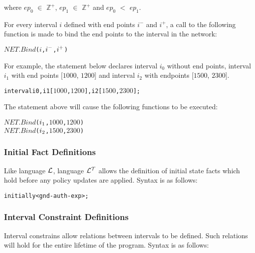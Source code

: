 \documentclass[11pt]{report}
\newenvironment{vverbatim}
{
  \begin{alltt}
}
{
  \vspace{-\baselineskip}
  \end{alltt}
}
\begin{document}
          \noindent
          where $ep_0$ $\in$ ${\mathbb Z}^+$, $ep_1$ $\in$ ${\mathbb Z}^+$ and
          $ep_0$ $<$ $ep_1$.

          For every interval $i$ defined with end points $i^-$ and $i^+$, a
          call to the following function is made to bind the end points to the
          interval in the network:

          \begin{vverbatim}
  \(NET.Bind\)(\(i\), \(i\sp{-}\), \(i\sp{+}\))
          \end{vverbatim}

          For example, the statement below declares interval $i_0$ without end
          points, interval $i_1$ with end points [$1000$, $1200$] and
          interval $i_2$ with endpoints [$1500$, $2300$].

          \begin{vverbatim}
  interval i0, i1 [\(1000\), \(1200\)], i2 [\(1500\), \(2300\)];
          \end{vverbatim}

          The statement above will cause the following functions to be
          executed:

          \begin{vverbatim}
  \(NET.Bind\)(\(i\sb{1}\), \(1000\), \(1200\))
  \(NET.Bind\)(\(i\sb{2}\), \(1500\), \(2300\))
          \end{vverbatim}

        \subsubsection{Initial Fact Definitions}

          Like language ${\cal L}$, language ${\cal L^T}$ allows the definition
          of initial state facts which hold before any policy updates are
          applied. Syntax is as follows:

          \begin{vverbatim}
  initially <gnd-auth-exp>;
          \end{vverbatim}

        \subsubsection{Interval Constraint Definitions}

          Interval constrains allow relations between intervals to be defined.
          Such relations will hold for the entire lifetime of the program.
          Syntax is as follows:
\end{document}
